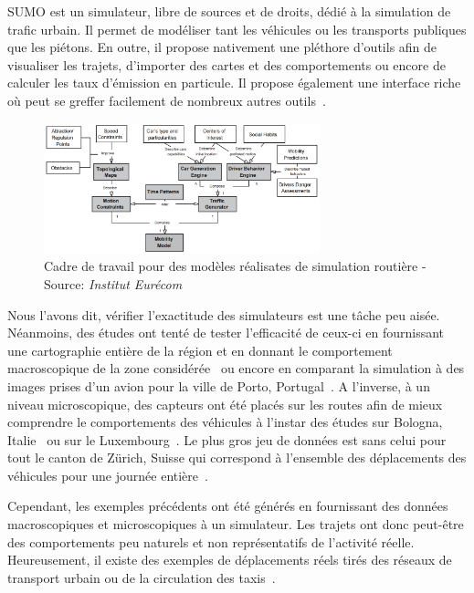 SUMO est un simulateur, libre de sources et de droits, dédié à la simulation de trafic urbain. Il permet de modéliser tant les véhicules ou les transports publiques que les piétons. En outre, il propose nativement une pléthore d'outils afin de visualiser les trajets, d'importer des cartes et des comportements ou encore de calculer les taux d'émission en particule. Il propose également une interface riche où peut se greffer facilement de nombreux autres outils~\cite{SUMO2012}.

\begin{figure}[ht]
\includegraphics[width=8cm]{Prevision/Model/modelisation_simulation}
\centering
\caption{Cadre de travail pour des modèles réalisates de simulation routière - Source: \textit{Institut Eurécom}~\cite{harri2009mobility}}
\end{figure}

Nous l'avons dit, vérifier l'exactitude des simulateurs est une tâche peu aisée. Néanmoins, des études ont tenté de tester l'efficacité de ceux-ci en fournissant une cartographie entière de la région et en donnant le comportement macroscopique de la zone considérée~\cite{baumann2008generic} ou encore en comparant la simulation à des images prises d'un avion pour la ville de Porto, Portugal~\cite{ferreira2009stereoscopic}. A l'inverse, à un niveau microscopique, des capteurs ont été placés sur les routes afin de mieux comprendre le comportements des véhicules à l'instar des études sur Bologna, Italie~\cite{bieker2015traffic} ou sur le Luxembourg~\cite{pigne2011vehicular}. Le plus gros jeu de données est sans celui pour tout le canton de Zürich, Suisse qui correspond à l'ensemble des déplacements des véhicules pour une journée entière~\cite{raney2003agent}.

Cependant, les exemples précédents ont été générés en fournissant des données macroscopiques et microscopiques à un simulateur. Les trajets ont donc peut-être des comportements peu naturels et non représentatifs de l'activité réelle. Heureusement, il existe des exemples de déplacements réels tirés des réseaux de transport urbain ou de la circulation des taxis~\cite{yuan2010t}.

